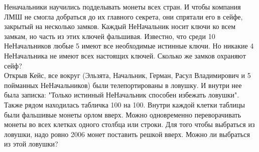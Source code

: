Неначальники научились подделывать монеты всех стран. И чтобы компания ЛМШ не смогла добраться до их главного секрета, они спрятали его в сейфе, закрытый на несколько замков. Каждый НеНачальник носит ключи ко всем замкам, но часть из этих ключей фальшивая. Известно, что среди 10 НеНачальников любые 5 имеют все необходимые истинные ключи. Но никакие 4 НеНачальника не имеют всех настоящих ключей. Сколько же замков охраняют сейф?\\

Открыв Кейс, все вокруг (Эльзята, Начальник, Герман, Расул Владимирович и 5 пойманных НеНачальников) были телепортированы в ловушку. И внутри нее была записка: "Только истинный НеНачальник способен избежать ловушки". Также рядом находилась табличка 100 на 100. Внутри каждой клетки таблицы были фальшивые монеты орлом вверх. Можно одновременно переворачивать монеты во всех клетках одного столбца или строки. Для того чтобы выбраться из ловушки, надо ровно 2006 монет поставить решкой вверх. Можно ли выбраться из этой ловушки?